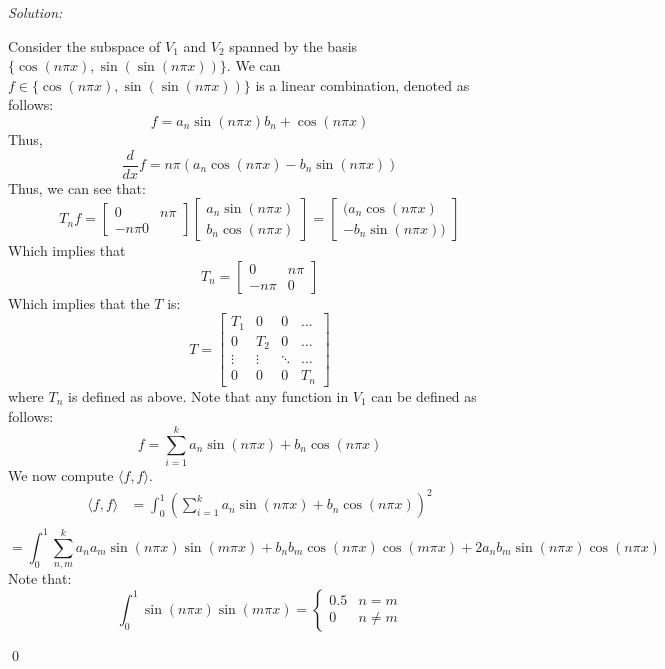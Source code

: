 \documentclass[12pt]{article}
\newenvironment{sol}
    {\emph{Solution:}
    }
    {
    \qed
    }
\begin{document}
\begin{sol}
    Consider the subspace of $V_1$ and $V_2$ spanned by the basis $\{ \cos (n \pi x), \sin (\sin (n \pi x))\}$. We can $f \in \{ \cos (n \pi x), \sin (\sin (n \pi x))\}$ is a linear combination, denoted as follows:
    \[
    f = a_n \sin(n \pi x) b_n + \cos (n \pi x)
    \]
    Thus, 
    \[
    \frac{d}{dx} f = n \pi (a_n \cos(n \pi x)  - b_n \sin (n \pi x))
    \]
    Thus, we can see that:
    \[
    T_nf = \begin{bmatrix}
        0 & n \pi \\
        - n \pi 0 
    \end{bmatrix} \begin{bmatrix}
        a_n \sin (n \pi x) \\ b_n \cos( n \pi x)
    \end{bmatrix} = \begin{bmatrix}
        (a_n \cos(n \pi x) \\ - b_n \sin (n \pi x))
    \end{bmatrix}
    \]
    Which implies that
    \[
    T_n = \begin{bmatrix}
        0 & n \pi \\
        - n \pi & 0 
    \end{bmatrix}
    \]
    Which implies that the $T$ is:
    \[
    T = \begin{bmatrix}
        T_1 & 0 & 0 & \dots \\
        0 & T_2 & 0 & \dots \\
        \vdots & \vdots & \ddots & \dots \\
        0 & 0 & 0 & T_n
    \end{bmatrix}
    \]
    where $T_n$ is defined as above. Note that any function in $V_1$ can be defined as follows:
    \[
    f = \sum_{i = 1}^{k} a_n \sin( n \pi x) + b_n \cos ( n \pi x)
    \]
    We now compute $\langle f , f \rangle$. 
    \begin{align*}
        \langle f , f \rangle &= \int_{0}^{1} \left( \sum_{i=1}^{k} a_n \sin(n \pi x) + b_n \cos (n \pi x) \right)^2\\
    \end{align*}
    \[
        = \int_{0}^{1} \sum_{n, m}^k a_n a_m \sin(n \pi x) \sin(m \pi x) + b_n b_m \cos (n \pi x) \cos( m \pi x) + 2a_n b_m \sin(n \pi x) \cos(n \pi x)
    \]
    Note that:
    \[
    \int_{0}^{1} \sin(n \pi x) \sin(m \pi x) = \begin{cases}
        0.5 & n = m \\
        0 & n \neq m

\end{cases}\]
\end{sol}
\end{document}
